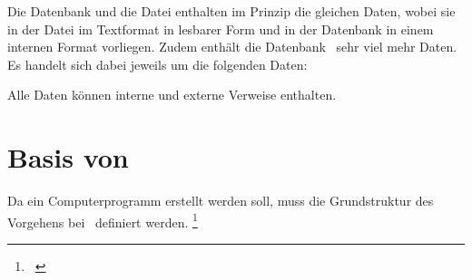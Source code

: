 Die Datenbank und die Datei enthalten im Prinzip die gleichen Daten, wobei sie in der Datei im Textformat in lesbarer Form und in der Datenbank in einem internen Format vorliegen.
Zudem enthält die Datenbank \textiAlg\ sehr viel mehr Daten. Es handelt sich dabei jeweils um die folgenden Daten:
\begin{description}
	\item[\Axiome]         \label{Daten:Axiom}         \AxiomDescription
	\item[\Saetze]         \label{Daten:Satz}          \SatzDescription
	\item[\Beweise]        \label{Daten:Beweis}        \BeweisDescription
	\item[\Fachbegriffe]   \label{Daten:Fachbegriff}   \FachbegriffDescription
	\item[\Fachgebiete]    \label{Daten:Fachgebiet}    \FachgebietDescription
	\item[\Ausgabeschemata]\label{Daten:Ausgabeschema} \AusgabeschemaDescription
	\item[\Auswertungen]   \label{Daten:Auswertung}    \AuswertungDescription
\end{description}
Alle Daten können interne und externe Verweise enthalten.

\color{gray}%
\section[Basis von Beweisen]{Basis von \Beweisen}%
\label                             {sec:BeweisBasis}

Da ein Computerprogramm erstellt werden soll, muss die Grundstruktur des Vorgehens bei \Beweisen\ definiert werden.%
\footnote{\seename~\cite{bib:Kalkuel}}

